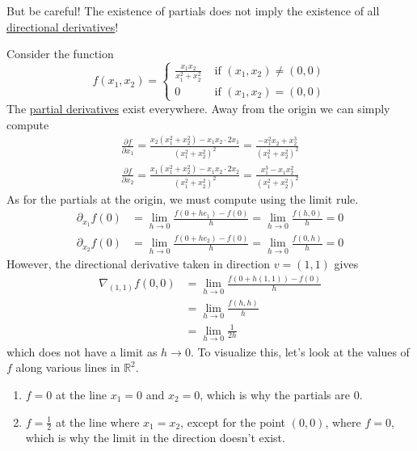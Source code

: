 	But be careful! The existence of partials does not imply the existence of all \hyperref[def:directional-derivative]{directional derivatives}! 

  \begin{example}
    \label{ex:existence-of-partials-centernotimplies}
    Consider the function 
    \begin{equation}
      f(x_1, x_2) = \begin{cases}
          \frac{x_1 x_2}{x_1^2 + x_2^2} & \text{ if } (x_1, x_2) \neq (0, 0) \\
          0 & \text{ if } (x_1, x_2) = (0, 0)
          \end{cases}
    \end{equation}
    The \hyperref[def:partial-derivative]{partial derivatives} exist everywhere. Away from the origin we can simply compute 
    \begin{align*}
        \frac{\partial f}{\partial x_1} = \frac{x_2 (x_1^2 + x_2^2) - x_1 x_2 \cdot 2x_1}{(x_1^2 + x_2^2)^2} = \frac{- x_1^2 x_2 + x_2^3}{(x_1^2 + x_2^2)^2} \\
        \frac{\partial f}{\partial x_2} = \frac{x_1 (x_1^2 + x_2^2) - x_1 x_2 \cdot 2 x_2}{(x_1^2 + x_2^2)^2} = \frac{x_1^3 - x_1 x_2^2}{(x_1^2 + x_2^2)^2}
    \end{align*}
    As for the partials at the origin, we must compute using the limit rule. 
    \begin{align*}
        \partial_{x_1} f (0) & = \lim_{h \rightarrow 0} \frac{f(0 + h e_1) - f(0)}{h} = \lim_{h \rightarrow 0} \frac{f(h, 0)}{h} = 0  \\
        \partial_{x_2} f (0) & = \lim_{h \rightarrow 0} \frac{f(0 + h e_2) - f(0)}{h} = \lim_{h \rightarrow 0} \frac{f(0, h)}{h} = 0
    \end{align*}
    However, the directional derivative taken in direction $v = (1, 1)$ gives 
    \begin{align*}
        \nabla_{(1, 1)} f (0, 0) & = \lim_{h \rightarrow 0} \frac{f(0 + h (1, 1)) - f(0)}{h} \\
        & = \lim_{h \rightarrow 0} \frac{f(h, h)}{h} \\
        & = \lim_{h \rightarrow 0} \frac{1}{2h} 
    \end{align*}
    which does not have a limit as $h \rightarrow 0$. To visualize this, let's look at the values of $f$ along various lines in $\mathbb{R}^2$. 
    \begin{enumerate}
        \item $f = 0$ at the line $x_1 = 0$ and $x_2 = 0$, which is why the partials are $0$. 
        \item $f = \frac{1}{2}$ at the line where $x_1 = x_2$, except for the point $(0, 0)$, where $f = 0$, which is why the limit in the direction doesn't exist. 
    \end{enumerate}
  \end{example}

